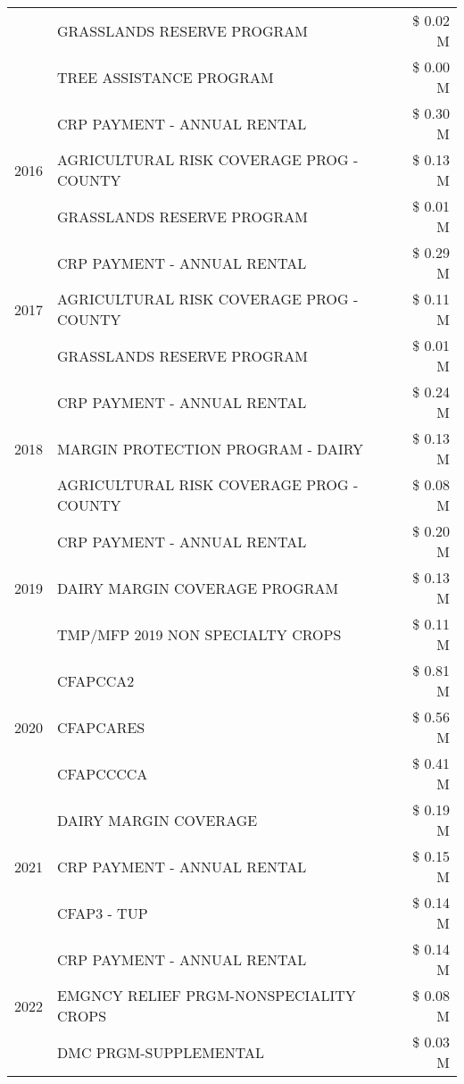 \begin{tabular}{llr}
 & GRASSLANDS RESERVE PROGRAM & \$ 0.02 M \\
 & TREE ASSISTANCE PROGRAM & \$ 0.00 M \\
\cline{1-3}
\multirow[t]{3}{*}{2016} & CRP PAYMENT - ANNUAL RENTAL & \$ 0.30 M \\
 & AGRICULTURAL RISK COVERAGE PROG - COUNTY & \$ 0.13 M \\
 & GRASSLANDS RESERVE PROGRAM & \$ 0.01 M \\
\cline{1-3}
\multirow[t]{3}{*}{2017} & CRP PAYMENT - ANNUAL RENTAL & \$ 0.29 M \\
 & AGRICULTURAL RISK COVERAGE PROG - COUNTY & \$ 0.11 M \\
 & GRASSLANDS RESERVE PROGRAM & \$ 0.01 M \\
\cline{1-3}
\multirow[t]{3}{*}{2018} & CRP PAYMENT - ANNUAL RENTAL & \$ 0.24 M \\
 & MARGIN PROTECTION PROGRAM - DAIRY & \$ 0.13 M \\
 & AGRICULTURAL RISK COVERAGE PROG - COUNTY & \$ 0.08 M \\
\cline{1-3}
\multirow[t]{3}{*}{2019} & CRP PAYMENT - ANNUAL RENTAL & \$ 0.20 M \\
 & DAIRY MARGIN COVERAGE PROGRAM & \$ 0.13 M \\
 & TMP/MFP 2019 NON SPECIALTY CROPS & \$ 0.11 M \\
\cline{1-3}
\multirow[t]{3}{*}{2020} & CFAPCCA2 & \$ 0.81 M \\
 & CFAPCARES & \$ 0.56 M \\
 & CFAPCCCCA & \$ 0.41 M \\
\cline{1-3}
\multirow[t]{3}{*}{2021} & DAIRY MARGIN COVERAGE & \$ 0.19 M \\
 & CRP PAYMENT - ANNUAL RENTAL & \$ 0.15 M \\
 & CFAP3 - TUP & \$ 0.14 M \\
\cline{1-3}
\multirow[t]{3}{*}{2022} & CRP PAYMENT - ANNUAL RENTAL & \$ 0.14 M \\
 & EMGNCY RELIEF PRGM-NONSPECIALITY CROPS & \$ 0.08 M \\
 & DMC PRGM-SUPPLEMENTAL & \$ 0.03 M \\
\cline{1-3}
\bottomrule
\end{tabular}
